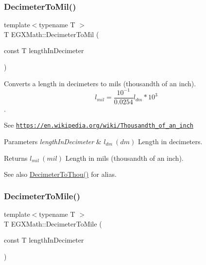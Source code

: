 \subsubsection{\texorpdfstring{Decimeter\+To\+Mil()}{DecimeterToMil()}}
{\footnotesize\ttfamily template$<$typename T $>$ \\
T E\+G\+X\+Math\+::\+Decimeter\+To\+Mil (\begin{DoxyParamCaption}\item[{const T}]{length\+In\+Decimeter }\end{DoxyParamCaption})}



Converts a length in decimeters to mils (thousandth of an inch). \[ l_{mil}= \frac{10^{-1}}{0.0254} l_{dm} * 10^{3} \]. 

See \href{https://en.wikipedia.org/wiki/Thousandth_of_an_inch}{\tt https\+://en.\+wikipedia.\+org/wiki/\+Thousandth\+\_\+of\+\_\+an\+\_\+inch} 
\begin{DoxyParams}{Parameters}
{\em length\+In\+Decimeter} & $ l_{dm}\ (dm)$ Length in decimeters. \\
\hline
\end{DoxyParams}
\begin{DoxyReturn}{Returns}
$ l_{mil}\ (mil)$ Length in mils (thousandth of an inch). 
\end{DoxyReturn}
\begin{DoxySeeAlso}{See also}
\mbox{\hyperlink{group___e_g_x_math-_conversions-_length_conversions-_decimeter-_imperial_gafc294e549fcdd1c43545ca9624abcafb}{Decimeter\+To\+Thou()}} for alias. 
\end{DoxySeeAlso}
\mbox{\label{group___e_g_x_math-_conversions-_length_conversions-_decimeter-_imperial_gab7d9d207fb6aa53999300baf5d9cea16}} 
\subsubsection{\texorpdfstring{Decimeter\+To\+Mile()}{DecimeterToMile()}}
{\footnotesize\ttfamily template$<$typename T $>$ \\
T E\+G\+X\+Math\+::\+Decimeter\+To\+Mile (\begin{DoxyParamCaption}\item[{const T}]{length\+In\+Decimeter }\end{DoxyParamCaption})}




